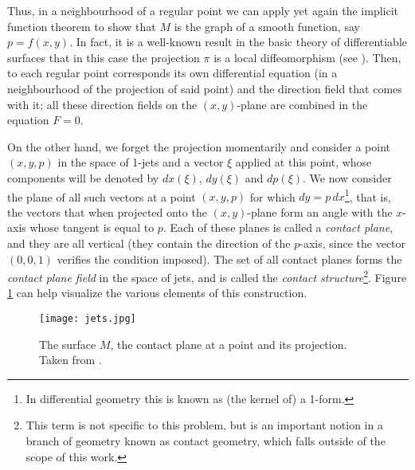 Thus, in a neighbourhood of a regular point we can apply yet again the implicit function theorem to show that $M$ is the graph of a smooth function, say $p=f(x,y)$. In fact, it is a well-known result in the basic theory of differentiable surfaces that in this case the projection $\pi$ is a local diffeomorphism (see \cite[39]{montiel2009curves}). Then, to each regular point corresponds its own differential equation (in a neighbourhood of the projection of said point) and the direction field that comes with it; all these direction fields on the $(x,y)$-plane are combined in the equation $F=0$.

On the other hand, we forget the projection momentarily and consider a point $(x,y,p)$ in the space of 1-jets and a vector $\xi$ applied at this point, whose components will be denoted by $dx(\xi)$, $dy(\xi)$ and $dp(\xi)$. We now consider the plane of all such vectors at a point $(x,y,p)$ for which $dy=p\,dx$\footnote{In differential geometry this is known as (the kernel of) a 1-form.}, that is, the vectors that when projected onto the $(x,y)$-plane form an angle  with the $x$-axis whose tangent is equal to $p$. Each of these planes is called a \textit{contact plane}, and they are all vertical (they contain the direction of the $p$-axis, since the vector $(0,0,1)$ verifies the condition imposed). The set of all contact planes forms the \textit{contact plane field} in the space of jets, and is called the \textit{contact structure}\footnote{This term is not specific to this problem, but is an important notion in a branch of geometry known as contact geometry, which falls outside of the scope of this work.}. Figure \ref{fig:jets} can help visualize the various elements of this construction.

\begin{figure}[h!]
\centering
\texttt{[image: jets.jpg]}
\caption{The surface $M$, the contact plane at a point and its projection. Taken from \cite{arnold2012geometrical}.}
\label{fig:jets}
\end{figure}

